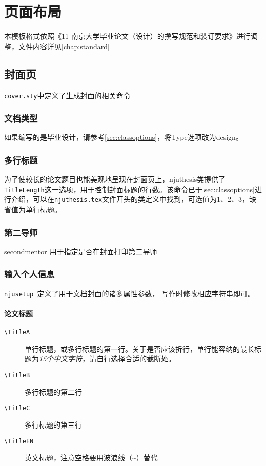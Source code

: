 \chapter{页面布局}

本模板格式依照《11-南京大学毕业论文（设计）的撰写规范和装订要求》进行调整，文件内容详见\cref{chap:standard}

\section{封面页}


\texttt{cover.sty}中定义了生成封面的相关命令



\subsection{文档类型}

如果编写的是毕业设计，请参考\cref{sec:classoptions}，将Type选项改为design。
\subsection{多行标题}

为了使较长的论文题目也能美观地呈现在封面页上，njuthesis类提供了\texttt{TitleLength}这一选项，用于控制封面标题的行数。该命令已于\cref{sec:classoptions}进行介绍，可以在\texttt{njuthesis.tex}文件开头的类定义中找到，可选值为1、2、3，缺省值为单行标题。

\subsection{第二导师}

secondmentor 用于指定是否在封面打印第二导师

\subsection{输入个人信息}

\texttt{njusetup }定义了用于文档封面的诸多属性参数，
写作时修改相应字符串即可。

\subsubsection{论文标题}
\begin{description}
    \item[\texttt{\textbackslash TitleA}] 单行标题，或多行标题的第一行。关于是否应该折行，单行能容纳的最长标题为\emph{15个中文字符}，请自行选择合适的截断处。
    \item[\texttt{\textbackslash TitleB}] 多行标题的第二行
    \item[\texttt{\textbackslash TitleC}] 多行标题的第三行
    \item[\texttt{\textbackslash Title\textunderscore EN}] 英文标题，注意空格要用波浪线（\textasciitilde）替代
\end{description}


